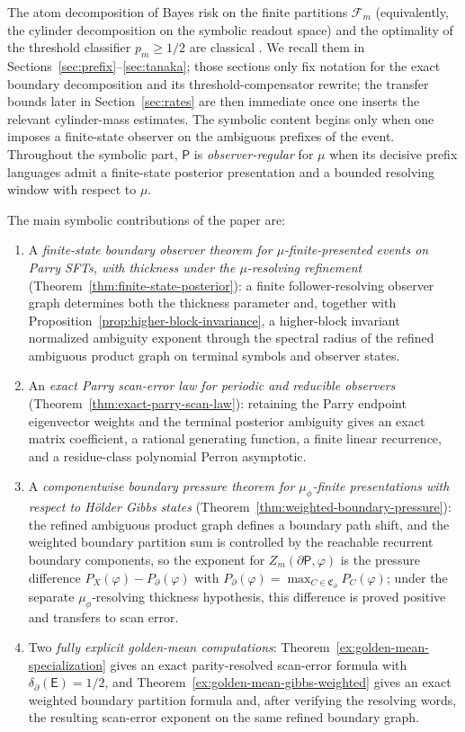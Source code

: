 \documentclass{etds}%
\numberwithin{equation}{section}
\theoremstyle{plain}
\theoremstyle{definition}
\theoremstyle{remark}
\begin{document}
The atom decomposition of Bayes risk on the finite partitions
$\mathcal{F}_m$ (equivalently, the cylinder decomposition on the symbolic
readout space) and the optimality of the threshold classifier
$p_m\ge 1/2$ are classical
\cite{Tsybakov2009Nonparametric,DevroyeGyorfiLugosi1996}.  We recall them in
Sections~\ref{sec:prefix}--\ref{sec:tanaka}; those sections only fix notation for the exact
boundary decomposition and its threshold-compensator rewrite; the transfer bounds
later in Section~\ref{sec:rates} are then immediate once one inserts the
relevant cylinder-mass estimates.  The symbolic content begins only when one
imposes a finite-state observer on the ambiguous prefixes of the event.
Throughout the symbolic part, $\mathsf{P}$ is \emph{observer-regular} for
$\mu$ when its decisive prefix languages admit a finite-state posterior
presentation and a bounded resolving window with respect to $\mu$.

The main symbolic contributions of the paper are:
\begin{enumerate}[label=(\roman*)]
\item A \emph{finite-state boundary observer theorem for $\mu$-finite-presented
  events on Parry SFTs, with thickness under the $\mu$-resolving refinement}
  (Theorem~\ref{thm:finite-state-posterior}): a finite follower-resolving
  observer graph determines both the thickness parameter and, together with
  Proposition~\ref{prop:higher-block-invariance}, a higher-block invariant
  normalized ambiguity exponent through the spectral radius of the refined
  ambiguous product graph on terminal symbols and observer states.
\item An \emph{exact Parry scan-error law for periodic and reducible observers}
  (Theorem~\ref{thm:exact-parry-scan-law}): retaining the Parry endpoint
  eigenvector weights and the terminal posterior ambiguity gives an exact
  matrix coefficient, a rational generating function, a finite linear
  recurrence, and a residue-class polynomial Perron asymptotic.
\item A \emph{componentwise boundary pressure theorem for $\mu_\phi$-finite
  presentations with respect to H\"older Gibbs states}
  (Theorem~\ref{thm:weighted-boundary-pressure}): the refined ambiguous
  product graph defines a boundary path shift, and the weighted boundary
  partition sum is controlled by the reachable recurrent boundary components,
  so the exponent for $Z_m(\partial\mathsf{P},\varphi)$ is the pressure
  difference
  $P_X(\varphi)-P_\partial(\varphi)$ with
  $P_\partial(\varphi)=\max_{C\in\mathfrak{C}_\partial}P_C(\varphi)$; under the
  separate $\mu_\phi$-resolving thickness hypothesis, this difference is
  proved positive and transfers to scan error.
\item Two \emph{fully explicit golden-mean computations}:
  Theorem~\ref{ex:golden-mean-specialization} gives an exact parity-resolved
  scan-error formula with $\delta_\partial(\mathsf{E})=1/2$, and
  Theorem~\ref{ex:golden-mean-gibbs-weighted} gives an exact weighted boundary
  partition formula and, after verifying the resolving words, the resulting
  scan-error exponent on the same refined boundary graph.
\end{enumerate}
\end{document}
